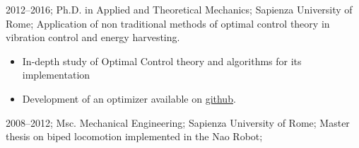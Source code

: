 \addstudy%
{%
    2012--2016;%
    Ph.D. in Applied and Theoretical Mechanics;%
    Sapienza University of Rome;%
    Application of non traditional methods of optimal control theory in vibration control and energy harvesting.%
    \begin{itemize}
        \item In-depth study of Optimal Control theory and algorithms for its implementation
        \item Development of an optimizer available on \href{https://github.com/rafaelrojasmiliani/krotov_ch6}{github}.
    \end{itemize}
}%

\addstudy%
{%
    2008--2012;%
    Msc. Mechanical Engineering;%
    Sapienza University of Rome;%
    Master thesis on biped locomotion implemented in the Nao Robot;%
}%
